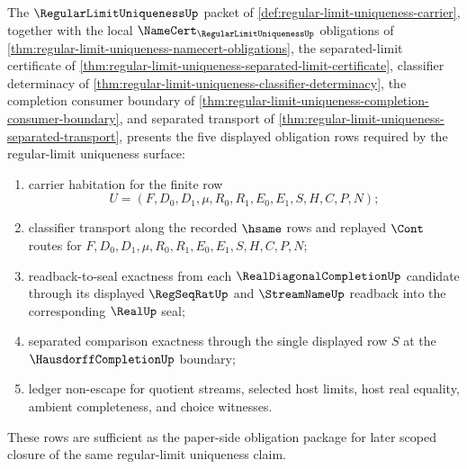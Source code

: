 \begin{theorem}
\label{thm:regular-limit-uniqueness-obligation-closure-package}
The $\RegularLimitUniquenessUp$ packet of \autoref{def:regular-limit-uniqueness-carrier}, together with the local $\NameCert_{\RegularLimitUniquenessUp}$ obligations of \autoref{thm:regular-limit-uniqueness-namecert-obligations}, the separated-limit certificate of \autoref{thm:regular-limit-uniqueness-separated-limit-certificate}, classifier determinacy of \autoref{thm:regular-limit-uniqueness-classifier-determinacy}, the completion consumer boundary of \autoref{thm:regular-limit-uniqueness-completion-consumer-boundary}, and separated transport of \autoref{thm:regular-limit-uniqueness-separated-transport}, presents the five displayed obligation rows required by the regular-limit uniqueness surface:
\begin{enumerate}
\item carrier habitation for the finite row
$$
U=(F,D_0,D_1,\mu,R_0,R_1,E_0,E_1,S,H,C,P,N);
$$
\item classifier transport along the recorded $\hsame$ rows and replayed $\Cont$ routes for $F,D_0,D_1,\mu,R_0,R_1,E_0,E_1,S,H,C,P,N$;
\item readback-to-seal exactness from each $\RealDiagonalCompletionUp$ candidate through its displayed $\RegSeqRatUp$ and $\StreamNameUp$ readback into the corresponding $\RealUp$ seal;
\item separated comparison exactness through the single displayed row $S$ at the $\HausdorffCompletionUp$ boundary;
\item ledger non-escape for quotient streams, selected host limits, host real equality, ambient completeness, and choice witnesses.
\end{enumerate}
These rows are sufficient as the paper-side obligation package for later scoped closure of the same regular-limit uniqueness claim.
\end{theorem}
